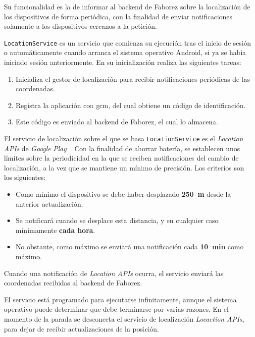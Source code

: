 \documentclass[main]{subfiles}
\begin{document}
Su funcionalidad es la de informar al \gls{backend} de Faborez sobre la localización de los dispositivos de forma periódica, con la finalidad de enviar notificaciones solamente a los dispositivos cercanos a la petición.

\texttt{LocationService} es un servicio que comienza su ejecución tras el inicio de sesión o automáticamente cuando arranca el sistema operativo Android, si ya se había iniciado sesión anteriormente. En su inicialización realiza las siguientes tareas:

\begin{enumerate}
  \item Inicializa el gestor de localización para recibir notificaciones periódicas de las coordenadas.
  \item Registra la aplicación con \gls{gcm}, del cual obtiene un código de identificación.
  \item Este código es enviado al \gls{backend} de Faborez, el cual lo almacena.
\end{enumerate}

El servicio de localización sobre el que se basa \texttt{LocationService} es el \emph{Location APIs} de \emph{Google Play}~\autocite{android-location}. Con la finalidad de ahorrar batería, se establecen unos límites sobre la periodicidad en la que se reciben notificaciones del cambio de localización, a la vez que se mantiene un mínimo de precisión. Los criterios son los siguientes:

\begin{itemize}
  \item Como mínimo el dispositivo se debe haber desplazado \textbf{\SI{250}{\meter}} desde la anterior actualización.
  \item Se notificará cuando se desplace esta distancia, y en cualquier caso mínimamente \textbf{cada hora}.
  \item No obstante, como máximo se enviará una notificación cada \textbf{\SI{10}{\minute}} como máximo.
\end{itemize}

Cuando una notificación de \emph{Location APIs} ocurra, el servicio enviará las coordenadas recibidas al \gls{backend} de Faborez.

El servicio está programado para ejecutarse infinitamente, aunque el sistema operativo puede determinar que debe terminarse por varias razones. En el momento de la parada se desconecta el servicio de localización \emph{Locaction APIs}, para dejar de recibir actualizaciones de la posición.
\end{document}
